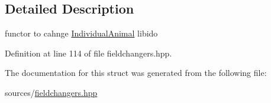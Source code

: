 \subsection{Detailed Description}
functor to cahnge \hyperlink{classIndividualAnimal}{IndividualAnimal} libido 

Definition at line 114 of file fieldchangers.hpp.



The documentation for this struct was generated from the following file:\begin{DoxyCompactItemize}
\item 
sources/\hyperlink{fieldchangers_8hpp}{fieldchangers.hpp}\end{DoxyCompactItemize}
